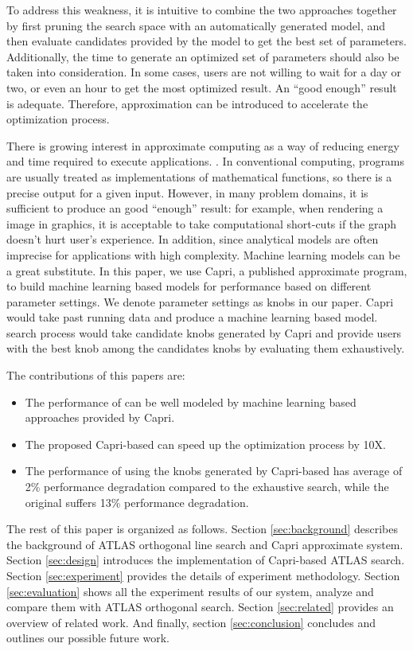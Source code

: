 \par
To address this weakness, it is intuitive to combine the two approaches together by first pruning the search
space with an automatically generated model, and then evaluate candidates
provided by the model to get the best set of parameters.
Additionally, the time to generate an optimized set of parameters
should also be taken into consideration. In some cases, users are not willing
to wait for a day or two, or even an hour to get the most optimized result. An
``good enough'' result is adequate. Therefore, approximation can be introduced
to accelerate the optimization process.

There is growing interest in approximate computing as a way of reducing energy
and time required to execute applications. \cite{ansel2011language,
baek2010green, sidiroglou2011managing, swaminathan2015case}. In conventional
computing, programs are usually treated as implementations of mathematical
functions, so there is a precise output for a given input.
However, in many problem domains, it is sufficient to produce an good ``enough''
result: for example, when rendering a image in graphics, it is
acceptable to take computational short-cuts if the graph doesn't hurt user's
experience. In addition, since analytical models are often imprecise for
applications with high complexity. Machine learning models can be a great
substitute. In this paper, we use Capri\cite{sui2016proactive}, a published
approximate program, to build machine learning based models for \gem performance
based on different parameter settings. We denote parameter settings as knobs in
our paper. Capri would take past \atl running data and produce a machine
learning based model. \atl search process would take candidate knobs generated
by Capri and provide users with the best knob among the candidates knobs by
evaluating them exhaustively.

The contributions of this papers are:
\begin{itemize}
\item The performance of \gem can be well modeled by machine learning based
approaches provided by Capri.
\item The proposed Capri-based \atl can speed up the optimization process by 10X.
\item The performance of \gem using the knobs generated by Capri-based \atl
has average of 2\% performance degradation compared to the exhaustive search,
while the original \atl suffers 13\% performance degradation.
\end{itemize}

\par
The rest of this paper is organized as follows. Section \ref{sec:background} describes the background of ATLAS
orthogonal line search and Capri approximate system.
Section \ref{sec:design} introduces the implementation of Capri-based ATLAS search.
Section \ref{sec:experiment} provides the details of experiment methodology.
Section \ref{sec:evaluation} shows all the experiment results of our system, analyze and compare them with ATLAS orthogonal search.
Section \ref{sec:related} provides an overview of related work.
And finally, section \ref{sec:conclusion} concludes and outlines our possible future work.
